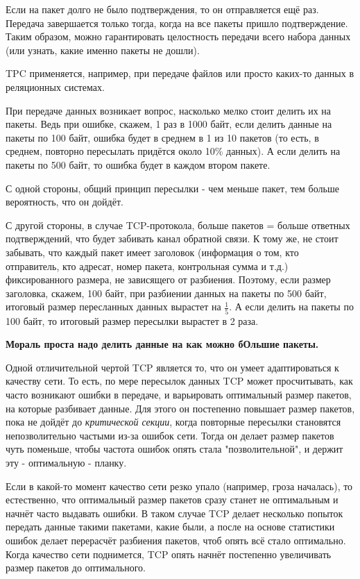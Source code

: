 Если на пакет долго не было подтверждения, то он отправляется ещё раз. Передача завершается только тогда, когда на все пакеты пришло подтверждение. Таким образом, можно гарантировать целостность передачи всего набора данных (или узнать, какие именно пакеты не дошли).

TPC применяется, например, при передаче файлов или просто каких-то данных в реляционных системах.

\bigskip
При передаче данных возникает вопрос, насколько мелко стоит делить их на пакеты. Ведь при ошибке, скажем, 1 раз в 1000 байт, если делить данные на пакеты по 100 байт, ошибка будет в среднем в 1 из 10 пакетов (то есть, в среднем, повторно пересылать придётся около 10\% данных). А если делить на пакеты по 500 байт, то ошибка будет в каждом втором пакете.

С одной стороны, общий принцип пересылки - чем меньше пакет, тем больше вероятность, что он дойдёт. 

С другой стороны, в случае TCP-протокола, больше пакетов = больше ответных подтверждений, что будет забивать канал обратной связи. К тому же, не стоит забывать, что каждый пакет имеет заголовок (информация о том, кто отправитель, кто адресат, номер пакета, контрольная сумма и т.д.) фиксированного размера, не зависящего от разбиения. Поэтому, если размер заголовка, скажем, 100 байт, при разбиении данных на пакеты по 500 байт, итоговый размер пересланных данных вырастет на $\frac{1}{5}$. А если делить на пакеты по 100 байт, то итоговый размер пересылки вырастет в 2 раза.

\textbf{Мораль проста надо делить данные на как можно бОльшие пакеты.}

Одной отличительной чертой TCP является то, что он умеет адаптироваться к качеству сети. То есть, по мере пересылок данных TCP может просчитывать, как часто возникают ошибки в передаче, и варьировать оптимальный размер пакетов, на которые разбивает данные. Для этого он постепенно повышает размер пакетов, пока не дойдёт до \textit{критической секции}, когда повторные пересылки становятся непозволительно частыми из-за ошибок сети. Тогда он делает размер пакетов чуть поменьше, чтобы частота ошибок опять стала "позволительной", и держит эту - оптимальную - планку.

Если в какой-то момент качество сети резко упало (например, гроза началась), то естественно, что оптимальный размер пакетов сразу станет не оптимальным и начнёт часто выдавать ошибки. В таком случае TCP делает несколько попыток передать данные такими пакетами, какие были, а после на основе статистики ошибок делает перерасчёт разбиения пакетов, чтоб опять всё стало оптимально. Когда качество сети поднимется, TCP опять начнёт постепенно увеличивать размер пакетов до оптимального.

